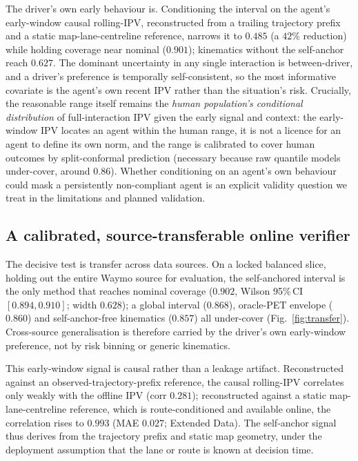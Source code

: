 \documentclass[12pt,a4paper]{article}
\begin{document}
The driver's own early behaviour is. Conditioning the interval on the agent's early-window
causal rolling-IPV, reconstructed from a trailing trajectory prefix and a static
map-lane-centreline reference, narrows it to $0.485$ (a $42\%$ reduction) while holding
coverage near nominal ($0.901$); kinematics without the self-anchor reach $0.627$. The
dominant uncertainty in any single interaction is between-driver, and a driver's preference
is temporally self-consistent, so the most informative covariate is the agent's own recent
IPV rather than the situation's risk. Crucially, the reasonable range itself remains the
\emph{human population's conditional distribution} of full-interaction IPV given the early
signal and context: the early-window IPV locates an agent within the human range, it is not a
licence for an agent to define its own norm, and the range is calibrated to cover human
outcomes by split-conformal prediction (necessary because raw quantile models under-cover,
around $0.86$). Whether conditioning on an agent's own behaviour could mask a persistently
non-compliant agent is an explicit validity question we treat in the limitations and planned
validation.

\subsection{A calibrated, source-transferable online verifier}
The decisive test is transfer across data sources. On a locked balanced slice, holding out
the entire Waymo source for evaluation, the self-anchored interval is the only method that
reaches nominal coverage ($0.902$, Wilson 95\%\,CI $[0.894,0.910]$; width $0.628$); a global
interval ($0.868$), oracle-PET envelope ($0.860$) and self-anchor-free kinematics ($0.857$)
all under-cover (Fig.~\ref{fig:transfer}). Cross-source generalisation is therefore carried
by the driver's own early-window preference, not by risk binning or generic kinematics.

This early-window signal is causal rather than a leakage artifact. Reconstructed against an
observed-trajectory-prefix reference, the causal rolling-IPV correlates only weakly with the
offline IPV (corr $0.281$); reconstructed against a static map-lane-centreline reference,
which is route-conditioned and available online, the correlation rises to $0.993$ (MAE
$0.027$; Extended Data). The self-anchor signal thus derives from the trajectory prefix and
static map geometry, under the deployment assumption that the lane or route is known at
decision time.
\end{document}
